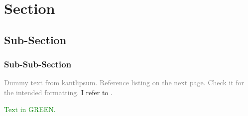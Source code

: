
\checkBeginRefsection%
\kant[20-21]

\section{Section}
\subsection{Sub-Section}
\subsubsection{Sub-Sub-Section}

\textcolor{gray}{Dummy text from kantlipsum. Reference listing on the next page. Check it for the intended formatting.} I refer to \citep{butin2009education, rudestam2014surviving, Goossens2008g,cassuto2010advising,pires2021teens}. 

\kant[9]


\kant[10]

\textcolor{green}{Text in GREEN.}

\kant[2-6]

\checkEndRefsection%
